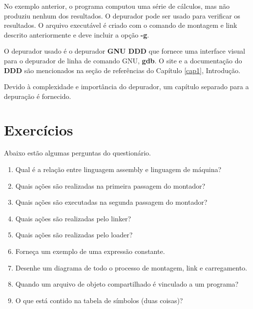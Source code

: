 No exemplo anterior, o programa computou uma série de cálculos, mas não produziu nenhum dos resultados. O depurador pode ser usado para verificar os resultados. O arquivo executável é criado com o comando de montagem e link descrito anteriormente e deve incluir a opção \textbf{-g}.

O depurador usado é o depurador \textbf{GNU DDD} que fornece uma interface visual para o depurador de linha de comando GNU, \textbf{gdb}. O site e a documentação do \textbf{DDD} são mencionados na seção de referências do Capítulo \ref{cap1}, Introdução.

Devido à complexidade e importância do depurador, um capítulo separado para a depuração é fornecido.

\section{Exercícios}
Abaixo estão algumas perguntas do questionário.
\begin{enumerate}
	\item Qual é a relação entre linguagem assembly e linguagem de máquina?
	\item Quais ações são realizadas na primeira passagem do montador?
	\item Quais ações são executadas na segunda passagem do montador?
	\item Quais ações são realizadas pelo linker?
	\item Quais ações são realizadas pelo loader?
	\item Forneça um exemplo de uma expressão constante.
	\item Desenhe um diagrama de todo o processo de montagem, link e carregamento.
	\item Quando um arquivo de objeto compartilhado é vinculado a um programa?
	\item O que está contido na tabela de símbolos (duas coisas)?
\end{enumerate}

